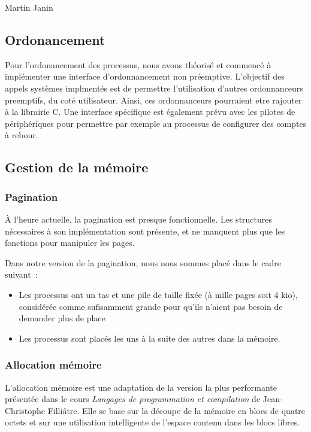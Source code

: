 \documentclass[a4paper,11pt]{article}
\begin{document}
Martin Janin

\subsection{Ordonancement}

Pour l'ordonancement des processus, nous avons théorisé et commencé à
implémenter une interface d'ordonnancement non préemptive. L'objectif des appels
systèmes implmentés est de permettre l'utilisation d'autres ordonnanceurs
preemptifs, du coté utilisateur. Ainsi, ces ordonnanceurs pourraient etre
rajouter à la librairie C.
Une interface spécifique est également prévu avec les pilotes de périphériques
pour permettre par exemple au processus de configurer des comptes à rebour.

\subsection{Gestion de la mémoire}

\subsubsection{Pagination}

À l'heure actuelle, la pagination est presque fonctionnelle. Les structures
nécessaires à son implémentation sont présente, et ne manquent plus que les
fonctions pour manipuler les pages.

Dans notre version de la pagination, nous nous sommes placé dans le cadre
suivant~:
\begin{itemize}
  \item Les processus ont un tas et une pile de taille fixée (à mille pages soit
    4 kio), considérée comme sufisamment grande pour qu'ils n'aient pas besoin
    de demander plus de place
  \item Les processus sont placés les uns à la suite des autres dans la mémoire.
\end{itemize}

\subsubsection{Allocation mémoire}

L'allocation mémoire est une adaptation de la version la plus performante
présentée dans le cours \emph{Langages de programmation et compilation} de
Jean-Christophe Filliâtre. Elle se base sur la découpe de la mémoire en blocs de
quatre octets et sur une utilisation intelligente de l'espace contenu dans les
blocs libres.
\end{document}
